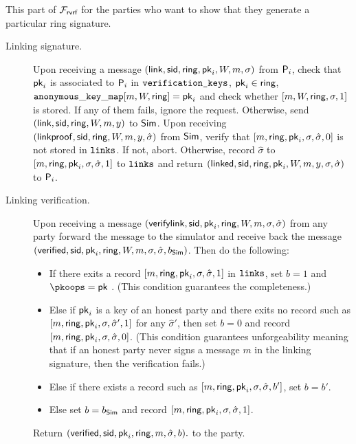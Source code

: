 \begin{tcolorbox}[colback=white]
{ \scriptsize
This part of $ \mathcal{F}_{\textsf{rvrf}} $ for the parties who want to show that they generate a particular ring signature.

\begin{description}
	\item[Linking signature.] Upon receiving a message $(\mathsf{link}, \textsf{sid}, \mathsf{ring}, \mathsf{pk}_i, W, m,\sigma)$ from $\mathsf{P}_i$, check that $\mathsf{pk}_i $ is associated to $\mathsf{P}_i$ in $ \texttt{verification\_keys} $, $ \mathsf{pk}_i \in \mathsf{ring} $, $ \mathtt{anonymous\_key\_map}[m,W, \mathsf{ring}] = \mathsf{pk}_i $ and 
	check whether $ [m, W,\mathsf{ring}, \sigma, 1] $ is stored. If any of them fails, ignore the request. Otherwise,
	send $(\mathsf{link}, \textsf{sid}, \mathsf{ring}, W, m, y)$ to $\mathsf{Sim}$. Upon receiving $(\mathsf{linkproof}, \textsf{sid}, \mathsf{ring}, W, m, y, \hat \sigma)$ from $\mathsf{Sim}$, verify that $ [m, \mathsf{ring}, \mathsf{pk}_i, \sigma, \hat{\sigma}, 0] $ is not stored in $ \texttt{links} $. If not, abort. Otherwise,  record $\hat\sigma$ to $[m, \mathsf{ring}, \mathsf{pk}_i,\sigma, \hat{\sigma}, 1]$ to $ \texttt{links} $ and return $(\mathsf{linked}, \textsf{sid}, \mathsf{ring}, \mathsf{pk}_i,W, m, y,\sigma, \hat\sigma)$ to $\mathsf{P}_i$.

	\item[Linking verification.] Upon receiving a message $(\mathsf{verifylink}, \textsf{sid}, \mathsf{pk}_i, \mathsf{ring}, W, m,\sigma,\hat\sigma)$ from any party forward the message to the simulator and receive back  the message $(\mathsf{verified}, \textsf{sid}, \mathsf{pk}_i, \mathsf{ring}, W,m, \sigma,\hat\sigma,  b_{\mathsf{Sim}})$. Then do the following:
	
	\begin{itemize}
		\item If there exits a record $ [m, \mathsf{ring},\mathsf{pk}_i,\sigma,\hat\sigma, 1] $ in $ \texttt{links} $, set $ b = 1 $ and {\color{blue} $ \pkoops = \pk $ }. (This condition guarantees the completeness.)
		\item Else if $ \mathsf{pk}_i $ is a key of an honest party and there exits no record such as $ [m, \mathsf{ring},\mathsf{pk}_i,\sigma,\hat\sigma',  1] $ for any  $  \hat\sigma'$, then set $ b = 0 $ and record $ [m, \mathsf{ring},\mathsf{pk}_i,\sigma,\hat\sigma,  0] $. (This condition guarantees unforgeability meaning that if an honest party never signs a message $ m $ in the linking signature, then the verification fails.)
		\item Else if there exists a record  such as $ [m, \mathsf{ring},\mathsf{pk}_i,\sigma,\hat\sigma,  b'] $, set $ b = b' $. 
		\item Else set $ b = b_{\mathsf{Sim}} $ and record $ [m, \mathsf{ring},\mathsf{pk}_i,\sigma,\hat\sigma,  1] $. 
	\end{itemize}
	
	Return $(\mathsf{verified}, \textsf{sid}, \mathsf{pk}_i, \mathsf{ring}, m, \hat\sigma, b).$ to the party.
\end{description}

}
\end{tcolorbox}



